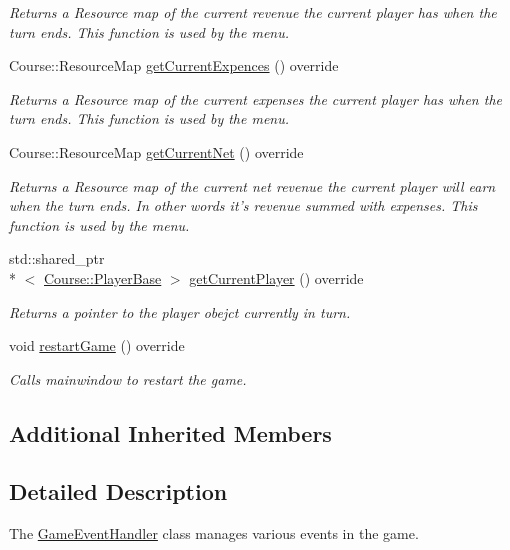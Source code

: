 \begin{DoxyCompactItemize}
\begin{DoxyCompactList}\small\item\em Returns a Resource map of the current revenue the current player has when the turn ends. This function is used by the menu. \end{DoxyCompactList}\item 
Course\-::\-Resource\-Map \hyperlink{class_student_1_1_game_event_handler_a09d07bb2da6806ab42608430ca3a6c33}{get\-Current\-Expences} () override
\begin{DoxyCompactList}\small\item\em Returns a Resource map of the current expenses the current player has when the turn ends. This function is used by the menu. \end{DoxyCompactList}\item 
Course\-::\-Resource\-Map \hyperlink{class_student_1_1_game_event_handler_ab1b3ce5dce712e2f60ab30a4127f325e}{get\-Current\-Net} () override
\begin{DoxyCompactList}\small\item\em Returns a Resource map of the current net revenue the current player will earn when the turn ends. In other words it's revenue summed with expenses. This function is used by the menu. \end{DoxyCompactList}\item 
std\-::shared\-\_\-ptr\\*
$<$ \hyperlink{class_course_1_1_player_base}{Course\-::\-Player\-Base} $>$ \hyperlink{class_student_1_1_game_event_handler_ae81b3048f48bd5b468ca37e91e9cfa8f}{get\-Current\-Player} () override
\begin{DoxyCompactList}\small\item\em Returns a pointer to the player obejct currently in turn. \end{DoxyCompactList}\item 
void \hyperlink{class_student_1_1_game_event_handler_a823856a979a4ab60f8f7cc4c3555ec1e}{restart\-Game} () override
\begin{DoxyCompactList}\small\item\em Calls mainwindow to restart the game. \end{DoxyCompactList}\end{DoxyCompactItemize}
\subsection*{Additional Inherited Members}


\subsection{Detailed Description}
The \hyperlink{class_student_1_1_game_event_handler}{Game\-Event\-Handler} class manages various events in the game. 


